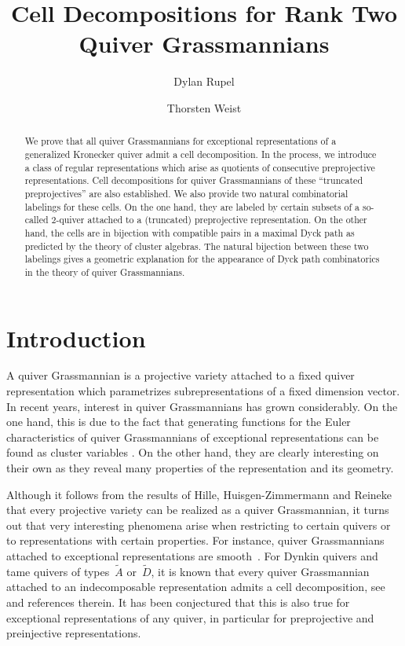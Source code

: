 \documentclass[smallextended,envcountsect,envcountsame]{svjour3}
\title{Cell Decompositions for Rank Two Quiver Grassmannians}
\author{Dylan Rupel \and Thorsten Weist}
\institute{Dylan Rupel \at University of Notre Dame, Department of Mathematics, Notre Dame, IN 46556, USA\\\email{drupel@nd.edu} \and Thorsten Weist \at Bergische Universit\"at Wuppertal, Gau\ss str.\ 20, 42097 Wuppertal, Germany\\\email{weist@uni-wuppertal.de}}
\numberwithin{equation}{section}
\begin{document}
\setcounter{tocdepth}{2}

\maketitle%

\begin{abstract}
  We prove that all quiver Grassmannians for exceptional representations of a generalized Kronecker quiver admit a cell decomposition.  
  In the process, we introduce a class of regular representations which arise as quotients of consecutive preprojective representations.
  Cell decompositions for quiver Grassmannians of these ``truncated preprojectives'' are also established. 
  We also provide two natural combinatorial labelings for these cells.
  On the one hand, they are labeled by certain subsets of a so-called $2$-quiver attached to a (truncated) preprojective representation.
  On the other hand, the cells are in bijection with compatible pairs in a maximal Dyck path as predicted by the theory of cluster algebras.
  The natural bijection between these two labelings gives a geometric explanation for the appearance of Dyck path combinatorics in the theory of quiver Grassmannians. 

\end{abstract}

\section{Introduction}
\noindent A quiver Grassmannian is a projective variety attached to a fixed quiver representation which parame\-tri\-zes subrepresentations of a fixed dimension vector.
In recent years, interest in quiver Grassmannians has grown considerably.
On the one hand, this is due to the fact that generating functions for the Euler characteristics of quiver Grassmannians of exceptional representations can be found as cluster variables \cite{ck}.
On the other hand, they are clearly interesting on their own as they reveal many properties of the representation and its geometry.

Although it follows from the results of Hille, Huisgen-Zimmermann and Reineke that every projective variety can be realized as a quiver Grassmannian, 
it turns out that very interesting phenomena arise when restricting to certain quivers or to representations with certain properties.
For instance, quiver Grassmannians attached to exceptional representations are smooth~\cite{cr}.
For Dynkin quivers and tame quivers of types~$\tilde A$ or~$\tilde D$, it is known that every quiver Grassmannian attached to an indecomposable representation admits a cell decomposition, see \cite{ce,lw} and references therein.
It has been conjectured that this is also true for exceptional representations of any quiver, in particular for preprojective and preinjective representations. 
\end{document}
